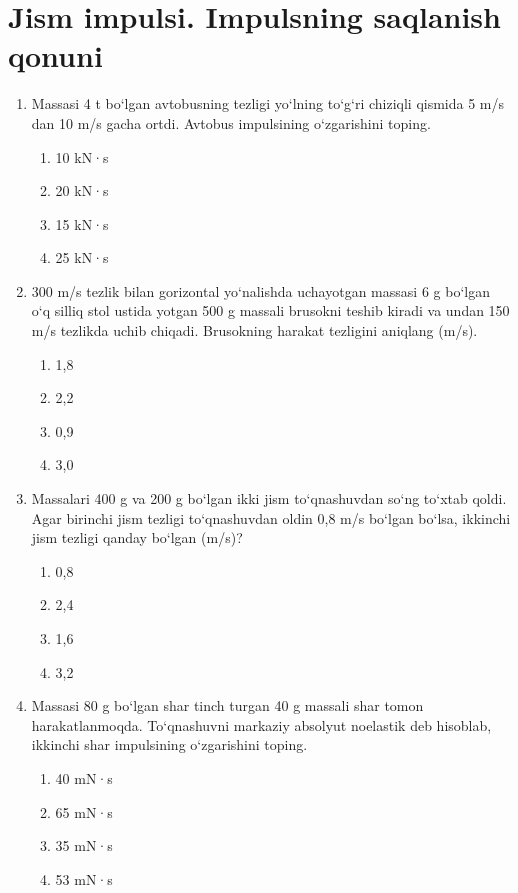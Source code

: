 \section{Jism impulsi. Impulsning saqlanish qonuni}

\begin{enumerate}
	
	\item Massasi 4 t bo‘lgan avtobusning tezligi yo‘lning to‘g‘ri chiziqli qismida 5 m/s dan 10 m/s gacha ortdi. Avtobus impulsining o‘zgarishini toping.
	\begin{enumerate}[label=\Alph*)]
		\item 10 kN·s
		\item 20 kN·s
		\item 15 kN·s
		\item 25 kN·s
	\end{enumerate}
	
	\item 300 m/s tezlik bilan gorizontal yo‘nalishda uchayotgan massasi 6 g bo‘lgan o‘q silliq stol ustida yotgan 500 g massali brusokni teshib kiradi va undan 150 m/s tezlikda uchib chiqadi. Brusokning harakat tezligini aniqlang (m/s).
	\begin{enumerate}[label=\Alph*)]
		\item 1,8
		\item 2,2
		\item 0,9
		\item 3,0
	\end{enumerate}
	
	\item Massalari 400 g va 200 g bo‘lgan ikki jism to‘qnashuvdan so‘ng to‘xtab qoldi. Agar birinchi jism tezligi to‘qnashuvdan oldin 0,8 m/s bo‘lgan bo‘lsa, ikkinchi jism tezligi qanday bo‘lgan (m/s)?
	\begin{enumerate}[label=\Alph*)]
		\item 0,8
		\item 2,4
		\item 1,6
		\item 3,2
	\end{enumerate}
	
	\item Massasi 80 g bo‘lgan shar tinch turgan 40 g massali shar tomon harakatlanmoqda. To‘qnashuvni markaziy absolyut noelastik deb hisoblab, ikkinchi shar impulsining o‘zgarishini toping.
	\begin{enumerate}[label=\Alph*)]
		\item 40 mN·s
		\item 65 mN·s
		\item 35 mN·s
		\item 53 mN·s
	\end{enumerate}
	

\end{enumerate}
